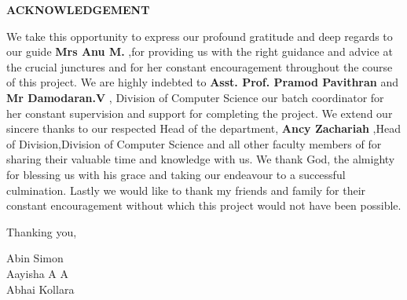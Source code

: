 \vspace{2in}

\centerline{\large{\bfseries{ACKNOWLEDGEMENT}}}

\hspace{1in}

\normalsize
We take this opportunity to express our profound gratitude and deep regards to our guide \textbf{Mrs Anu M.}
,for providing us with the right guidance and advice at the crucial junctures and for her constant encouragement throughout the course of this project. We are highly indebted to \textbf{Asst. Prof. Pramod Pavithran}
 and \textbf{Mr Damodaran.V}
 , Division of Computer Science our batch coordinator for her constant supervision and support for completing the project. We extend our sincere thanks to our respected Head of the department, \textbf{Ancy Zachariah}
 ,Head of Division,Division of Computer Science and all other faculty members of for sharing their valuable time and knowledge with us. We thank God, the almighty for blessing us with his grace and taking our endeavour to a successful culmination. Lastly we would like to thank my friends and family for their constant encouragement without which this project would not have been possible.

\begin{flushright}

\vspace{2em}

Thanking you,\\
\vspace{1em}

Abin Simon\\
Aayisha A A\\
Abhai Kollara\\

\end{flushright}
